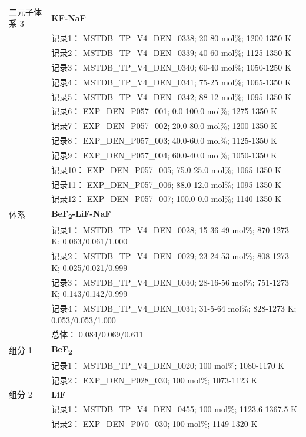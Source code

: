\documentclass[12pt]{article}
\begin{document}
{\begin{longtable}[]{@{}
  >{\raggedright\arraybackslash}p{}
  >{\raggedright\arraybackslash}p{}@{}}
二元子体系 3  & \textbf{KF-NaF} \\
 & 记录1： MSTDB\_TP\_V4\_DEN\_0338; 20-80 mol\%; 1200-1350 K \\
 & 记录2： MSTDB\_TP\_V4\_DEN\_0339; 40-60 mol\%; 1125-1350 K \\
 & 记录3： MSTDB\_TP\_V4\_DEN\_0340; 60-40 mol\%; 1050-1250 K \\
 & 记录4： MSTDB\_TP\_V4\_DEN\_0341; 75-25 mol\%; 1065-1350 K \\
 & 记录5： MSTDB\_TP\_V4\_DEN\_0342; 88-12 mol\%; 1095-1350 K \\
 & 记录6： EXP\_DEN\_P057\_001; 0.0-100.0 mol\%; 1275-1350 K \\
 & 记录7： EXP\_DEN\_P057\_002; 20.0-80.0 mol\%; 1200-1350 K \\
 & 记录8： EXP\_DEN\_P057\_003; 40.0-60.0 mol\%; 1125-1350 K \\
 & 记录9： EXP\_DEN\_P057\_004; 60.0-40.0 mol\%; 1050-1350 K \\
 & 记录10： EXP\_DEN\_P057\_005; 75.0-25.0 mol\%; 1065-1350 K \\
 & 记录11： EXP\_DEN\_P057\_006; 88.0-12.0 mol\%; 1095-1350 K \\
 & 记录12： EXP\_DEN\_P057\_007; 100.0-0.0 mol\%; 1140-1350 K  \\

\midrule
体系 & \textbf{BeF\textsubscript{2}-LiF-NaF} \\
 & 记录1： MSTDB\_TP\_V4\_DEN\_0028; 15-36-49 mol\%; 870-1273 K; 0.063/0.061/1.000 \\
 & 记录2： MSTDB\_TP\_V4\_DEN\_0029; 23-24-53 mol\%; 808-1273 K; 0.025/0.021/0.999 \\
 & 记录3： MSTDB\_TP\_V4\_DEN\_0030; 28-16-56 mol\%; 751-1273 K; 0.143/0.142/0.999 \\
 & 记录4： MSTDB\_TP\_V4\_DEN\_0031; 31-5-64 mol\%; 828-1273 K; 0.053/0.053/1.000 \\
 & 总体： 0.084/0.069/0.611  \\

组分 1  & \textbf{BeF\textsubscript{2}} \\
 & 记录1： MSTDB\_TP\_V4\_DEN\_0020; 100 mol\%; 1080-1170 K \\
 & 记录2： EXP\_DEN\_P028\_030; 100 mol\%; 1073-1123 K  \\

组分 2  & \textbf{LiF} \\
 & 记录1： MSTDB\_TP\_V4\_DEN\_0455; 100 mol\%; 1123.6-1367.5 K \\
 & 记录2： EXP\_DEN\_P070\_030; 100 mol\%; 1149-1320 K  \\


\end{longtable}}
\end{document}
